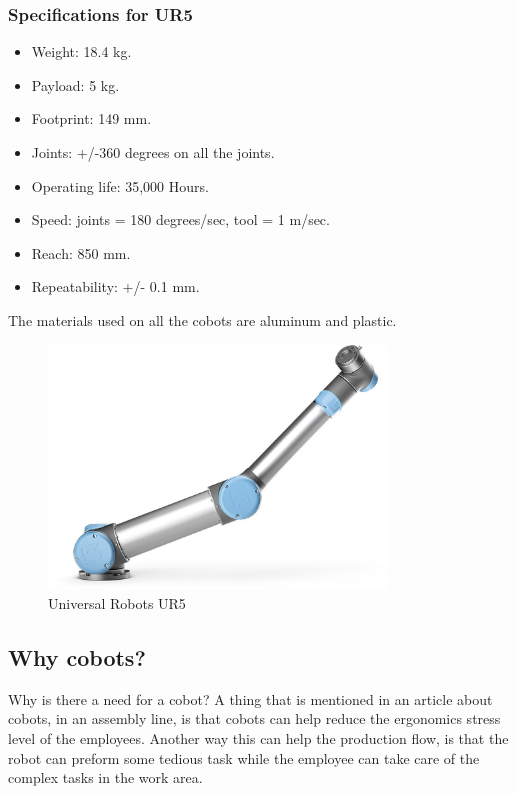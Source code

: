 \subsubsection{Specifications for UR5}

\begin{itemize}
    \item Weight: 18.4 kg.
    \item Payload: 5 kg.
    \item Footprint: 149 mm.
    \item Joints: +/-360 degrees on all the joints.
    \item Operating life: 35,000 Hours.
    \item Speed: joints = 180 degrees/sec, tool = 1 m/sec.
    \item Reach: 850 mm.
    \item Repeatability: +/- 0.1 mm.
\end{itemize}

The materials used on all the cobots are aluminum and plastic\cite{Ur5_about}\cite{UR5_tech}.\\

\begin{figure}
    \centering
    \includegraphics[width=9cm]{UR/UR5pic.jpg}
    \caption{Universal Robots UR5 \cite{UR5billede}}
    \label{fig:UR5}
\end{figure}


\subsection{Why cobots?}\label{ch:Whycobot}
Why is there a need for a cobot? A thing that is mentioned in an article about cobots, in an assembly line, is that cobots can help reduce the ergonomics stress level of the employees\cite{Coboau}. Another way this can help the production flow, is that the robot can preform some tedious task while the employee can take care of the complex tasks in the work area.\\



